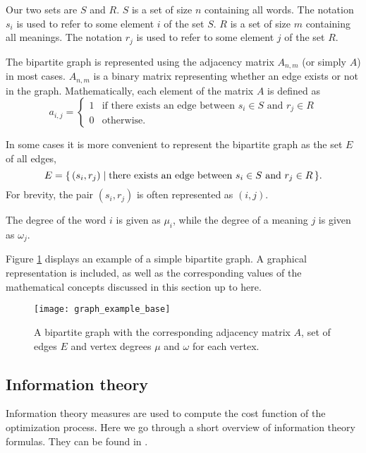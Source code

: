 Our two sets are $S$ and $R$.
$S$ is a set of size $n$ containing all words.
The notation $s_i$ is used to refer to some element $i$ of the set $S$.
$R$ is a set of size $m$ containing all meanings.
The notation $r_j$ is used to refer to some element $j$ of the set $R$.

The bipartite graph is represented using the adjacency matrix $A_{n,m}$ (or simply $A$) in most cases.
$A_{n,m}$ is a \nbym{} binary matrix representing whether an edge exists or not in the graph.
Mathematically, each element of the matrix $A$ is defined as
\begin{equation*}
  a_{i,j} =
  \begin{cases}
    1 & \text{if there exists an edge between $s_i \in S$ and $r_j \in R$} \\
    0 & \text{otherwise.}
  \end{cases}
\end{equation*}

In some cases it is more convenient to represent the bipartite graph as the set $E$ of all edges,
\begin{equation*}
  E = \{\,(s_i,r_j)\mid\text{there exists an edge between $s_i \in S$ and $r_j \in R$}\,\}.
\end{equation*}
For brevity, the pair $(s_i, r_j)$ is often represented as $(i,j)$.

The degree of the word $i$ is given as $\mu_i$, while the degree of a meaning $j$ is given as $\omega_j$.

Figure \ref{fig:graph-example-base} displays an example of a simple bipartite graph.
A graphical representation is included, as well as the corresponding values of the mathematical concepts discussed in this section up to here.

\begin{figure}
  \centering
  \texttt{[image: graph\_example\_base]}
  \caption{%
    A bipartite graph with the corresponding adjacency matrix $A$, set of edges $E$ and vertex degrees $\mu$ and $\omega$ for each vertex.
  }
  \label{fig:graph-example-base}
\end{figure}

\subsection{Information theory}
\label{sec:introduction_model_info-theory}

Information theory measures are used to compute the cost function of the optimization process.
Here we go through a short overview of information theory formulas. They can be found in \cite{Cover1999}.

